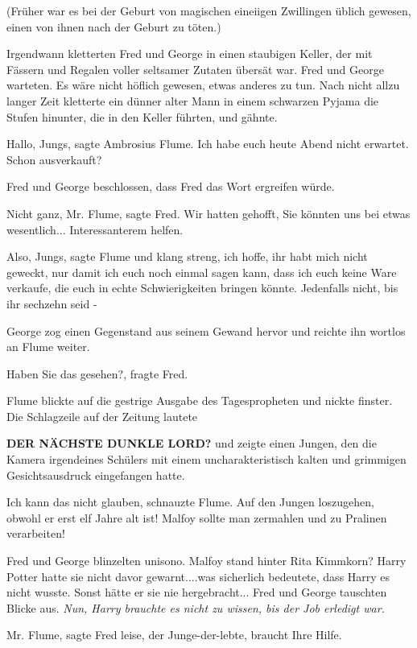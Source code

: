(Früher war es bei der Geburt von magischen eineiigen Zwillingen üblich gewesen,
einen von ihnen nach der Geburt zu töten.)

Irgendwann kletterten Fred und George in einen staubigen Keller, der mit Fässern
und Regalen voller seltsamer Zutaten übersät war. Fred und George warteten. Es
wäre nicht höflich gewesen, etwas anderes zu tun. Nach nicht allzu langer Zeit
kletterte ein dünner alter Mann in einem schwarzen Pyjama die Stufen hinunter,
die in den Keller führten, und gähnte.

\glqq{}Hallo, Jungs\grqq{}, sagte Ambrosius Flume. \glqq{}Ich habe euch heute
Abend nicht erwartet. Schon ausverkauft?\grqq{}

Fred und George beschlossen, dass Fred das Wort ergreifen würde.

\glqq{}Nicht ganz, Mr. Flume\grqq{}, sagte Fred. \glqq{}Wir hatten gehofft, Sie
könnten uns bei etwas wesentlich... Interessanterem helfen.\grqq{}

\glqq{}Also, Jungs\grqq{}, sagte Flume und klang streng, \glqq{}ich hoffe, ihr
habt mich nicht geweckt, nur damit ich euch noch einmal sagen kann, dass ich
euch keine Ware verkaufe, die euch in echte Schwierigkeiten bringen könnte.
Jedenfalls nicht, bis ihr sechzehn seid -\grqq{}

George zog einen Gegenstand aus seinem Gewand hervor und reichte ihn wortlos an
Flume weiter.

\glqq{}Haben Sie das gesehen?\grqq{}, fragte Fred.

Flume blickte auf die gestrige Ausgabe des Tagespropheten und nickte finster.
Die Schlagzeile auf der Zeitung lautete

\textbf{DER NÄCHSTE DUNKLE LORD?} und zeigte einen Jungen, den die Kamera
irgendeines Schülers mit einem uncharakteristisch kalten und grimmigen
Gesichtsausdruck eingefangen hatte.

\glqq{}Ich kann das nicht glauben\grqq{}, schnauzte Flume. \glqq{}Auf den Jungen
loszugehen, obwohl er erst elf Jahre alt ist! Malfoy sollte man zermahlen und zu
Pralinen verarbeiten!\grqq{}

Fred und George blinzelten unisono. Malfoy stand hinter Rita Kimmkorn? Harry
Potter hatte sie nicht davor gewarnt....was sicherlich bedeutete, dass Harry es
nicht wusste. Sonst hätte er sie nie hergebracht... Fred und George tauschten
Blicke aus.
\emph{Nun, Harry brauchte es nicht zu wissen, bis der Job erledigt war.}

\glqq{}Mr. Flume\grqq{}, sagte Fred leise, \glqq{}der Junge-der-lebte, braucht
Ihre Hilfe.\grqq{}

